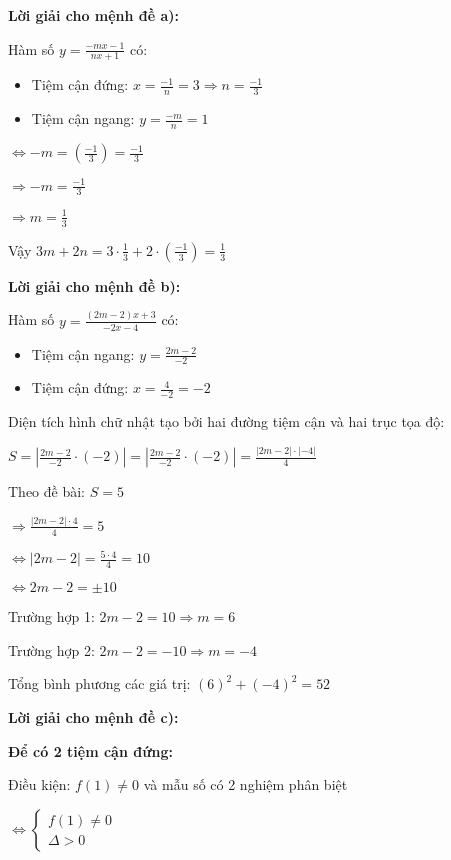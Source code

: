 \documentclass{article}
\begin{document}
\textbf{Lời giải cho mệnh đề a):}

Hàm số \(y = \frac{-mx - 1}{nx + 1}\) có:

\begin{itemize}
\item Tiệm cận đứng:
\(x = \frac{-1}{n} = 3 \Rightarrow n = \frac{-1}{3}\)
\item Tiệm cận ngang:
\(y = \frac{-m}{n} = 1\)
\end{itemize}

\(\Leftrightarrow -m = (\frac{-1}{3}) = \frac{-1}{3}\)

\(\Rightarrow -m = \frac{-1}{3}\)

\(\Rightarrow m = \frac{1}{3}\)

Vậy \(3m + 2n = 3 \cdot \frac{1}{3} + 2 \cdot (\frac{-1}{3}) = \frac{1}{3}\)

\textbf{Lời giải cho mệnh đề b):}

Hàm số \(y = \frac{(2m - 2)x + 3}{-2x - 4}\) có:

\begin{itemize}
\item Tiệm cận ngang: \(y = \frac{2m - 2}{-2}\)
\item Tiệm cận đứng: \(x = \frac{4}{-2} = -2\)
\end{itemize}

Diện tích hình chữ nhật tạo bởi hai đường tiệm cận và hai trục tọa độ:

\(S = \left| \frac{2m - 2}{-2} \cdot (-2) \right| = \left| \frac{2m - 2}{-2} \cdot (-2) \right| = \frac{|2m - 2| \cdot |-4|}{4}\)

Theo đề bài: \(S = 5\)

\(\Rightarrow \frac{|2m - 2| \cdot 4}{4} = 5\)

\(\Leftrightarrow |2m - 2| = \frac{5 \cdot 4}{4} = 10\)

\(\Leftrightarrow 2m - 2 = \pm 10\)

Trường hợp 1: \(2m - 2 = 10 \Rightarrow m = 6\)

Trường hợp 2: \(2m - 2 = -10 \Rightarrow m = -4\)

Tổng bình phương các giá trị: \((6)^2 + (-4)^2 = 52\)

\textbf{Lời giải cho mệnh đề c):}

\textbf{Để có 2 tiệm cận đứng:}

Điều kiện: \(f(1) \neq 0\) và mẫu số có 2 nghiệm phân biệt

\(\Leftrightarrow \begin{cases}
f(1) \neq 0 \\
\Delta > 0
\end{cases}\)
\end{document}
